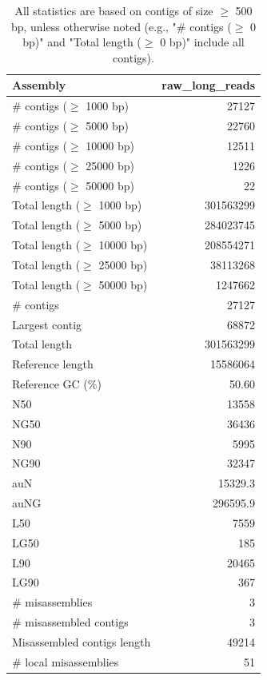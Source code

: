 \documentclass[12pt,a4paper]{article}
\begin{document}
\begin{table}[ht]
\begin{center}
\caption{All statistics are based on contigs of size $\geq$ 500 bp, unless otherwise noted (e.g., "\# contigs ($\geq$ 0 bp)" and "Total length ($\geq$ 0 bp)" include all contigs).}
\begin{tabular}{|l*{1}{|r}|}
\hline
Assembly & raw\_long\_reads \\ \hline
\# contigs ($\geq$ 1000 bp) & 27127 \\ \hline
\# contigs ($\geq$ 5000 bp) & 22760 \\ \hline
\# contigs ($\geq$ 10000 bp) & 12511 \\ \hline
\# contigs ($\geq$ 25000 bp) & 1226 \\ \hline
\# contigs ($\geq$ 50000 bp) & 22 \\ \hline
Total length ($\geq$ 1000 bp) & 301563299 \\ \hline
Total length ($\geq$ 5000 bp) & 284023745 \\ \hline
Total length ($\geq$ 10000 bp) & 208554271 \\ \hline
Total length ($\geq$ 25000 bp) & 38113268 \\ \hline
Total length ($\geq$ 50000 bp) & 1247662 \\ \hline
\# contigs & 27127 \\ \hline
Largest contig & 68872 \\ \hline
Total length & 301563299 \\ \hline
Reference length & 15586064 \\ \hline
Reference GC (\%) & 50.60 \\ \hline
N50 & 13558 \\ \hline
NG50 & 36436 \\ \hline
N90 & 5995 \\ \hline
NG90 & 32347 \\ \hline
auN & 15329.3 \\ \hline
auNG & 296595.9 \\ \hline
L50 & 7559 \\ \hline
LG50 & 185 \\ \hline
L90 & 20465 \\ \hline
LG90 & 367 \\ \hline
\# misassemblies & 3 \\ \hline
\# misassembled contigs & 3 \\ \hline
Misassembled contigs length & 49214 \\ \hline
\# local misassemblies & 51 \\ \hline

\end{tabular}
\end{center}
\end{table}
\end{document}
